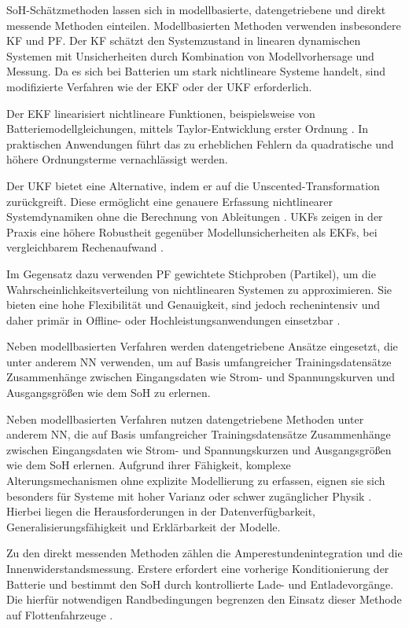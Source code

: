 \acs{SoH}-Schätzmethoden lassen sich in modellbasierte, datengetriebene und direkt messende Methoden einteilen.
Modellbasierten Methoden verwenden insbesondere \ac{KF} und \ac{PF}. Der \acs{KF} schätzt den Systemzustand in linearen dynamischen Systemen mit Unsicherheiten durch Kombination von Modellvorhersage und Messung. Da es sich bei Batterien um stark nichtlineare Systeme handelt, sind modifizierte Verfahren wie der \ac{EKF} oder der \ac{UKF} erforderlich. 
\par
Der \acs{EKF} linearisiert nichtlineare Funktionen, beispielsweise von Batteriemodellgleichungen, mittels Taylor-Entwicklung erster Ordnung \cite{urlIdEKF}. In praktischen Anwendungen führt das zu erheblichen Fehlern da quadratische und höhere Ordnungsterme vernachlässigt werden. 
\par
Der \acs{UKF} bietet eine Alternative, indem er auf die Unscented-Transformation zurückgreift. Diese ermöglicht eine genauere Erfassung nichtlinearer Systemdynamiken ohne die Berechnung von Ableitungen \cite{urlIdUKF}. \acs{UKF}s zeigen in der Praxis eine höhere Robustheit gegenüber Modellunsicherheiten als EKFs, bei vergleichbarem Rechenaufwand \cite{urlIdEKFvsUKF}.
\par
Im Gegensatz dazu verwenden \acs{PF} gewichtete Stichproben (Partikel), um die Wahrscheinlichkeitsverteilung von nichtlinearen Systemen zu approximieren. Sie bieten eine hohe Flexibilität und Genauigkeit, sind jedoch rechenintensiv und daher primär in Offline- oder Hochleistungsanwendungen einsetzbar \cite{urlIdPF}.
\par
Neben modellbasierten Verfahren werden datengetriebene Ansätze eingesetzt, die unter anderem \ac{NN} verwenden, um auf Basis umfangreicher Trainingsdatensätze Zusammenhänge zwischen Eingangsdaten wie Strom- und Spannungskurven und Ausgangsgrößen wie dem \acs{SoH} zu erlernen.
\par
Neben modellbasierten Verfahren nutzen datengetriebene Methoden unter anderem \ac{NN}, die auf Basis umfangreicher Trainingsdatensätze Zusammenhänge zwischen Eingangsdaten wie Strom- und Spannungskurzen und Ausgangsgrößen wie dem \acs{SoH} erlernen. Aufgrund ihrer Fähigkeit, komplexe Alterungsmechanismen ohne explizite Modellierung zu erfassen, eignen sie sich besonders für Systeme mit hoher Varianz oder schwer zugänglicher Physik \cite{urlIdNNfürRUL}. Hierbei liegen die Herausforderungen in der Datenverfügbarkeit, Generalisierungsfähigkeit und Erklärbarkeit der Modelle.
\par
Zu den direkt messenden Methoden zählen die Amperestundenintegration und die Innenwiderstandsmessung. Erstere erfordert eine vorherige Konditionierung der Batterie und bestimmt den \acs{SoH} durch kontrollierte Lade- und Entladevorgänge. Die hierfür notwendigen Randbedingungen begrenzen den Einsatz dieser Methode auf Flottenfahrzeuge \cite{SOHCoulombCounting}.
